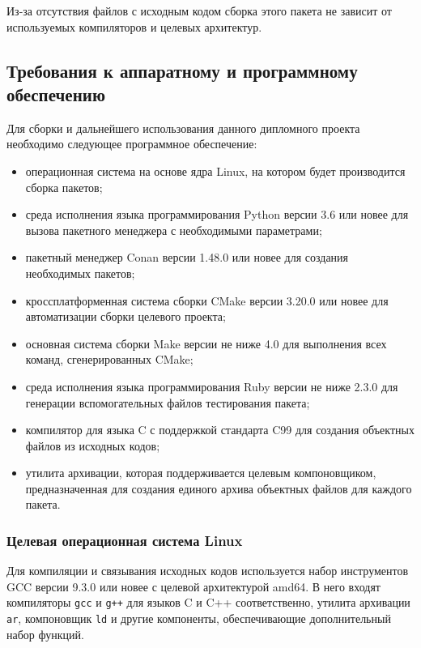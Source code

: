 Из-за отсутствия файлов с исходным кодом сборка этого пакета не зависит от используемых компиляторов и целевых архитектур.

\subsection{Требования к аппаратному и программному обеспечению}

Для сборки и дальнейшего использования данного дипломного проекта необходимо следующее программное обеспечение:
\begin{itemize}
    \item операционная система на основе ядра Linux, на котором будет производится сборка пакетов;
    \item среда исполнения языка программирования Python версии 3.6 или новее для вызова пакетного менеджера с необходимыми параметрами;
    \item пакетный менеджер Conan версии 1.48.0 или новее для создания необходимых пакетов;
    \item кроссплатформенная система сборки CMake версии 3.20.0 или новее
    для автоматизации сборки целевого проекта;
    \item основная система сборки Make версии не ниже 4.0 для выполнения всех команд,
    сгенерированных CMake;
    \item среда исполнения языка программирования Ruby версии не ниже 2.3.0
    для генерации вспомогательных файлов тестирования пакета;
    \item компилятор для языка C с поддержкой стандарта C99 для создания объектных
    файлов из исходных кодов;
    \item утилита архивации, которая поддерживается целевым компоновщиком,
    предназначенная для создания единого архива объектных файлов для каждого пакета.
\end{itemize}

\subsubsection{Целевая операционная система Linux}

Для компиляции и связывания исходных кодов используется
набор инструментов GCC версии 9.3.0 или новее с целевой архитектурой amd64.
В него входят компиляторы \lstinline{gcc} и \lstinline{g++} для языков C и C++ соответственно,
утилита архивации \lstinline{ar},
компоновщик \lstinline{ld} и другие компоненты, обеспечивающие дополнительный набор функций.

